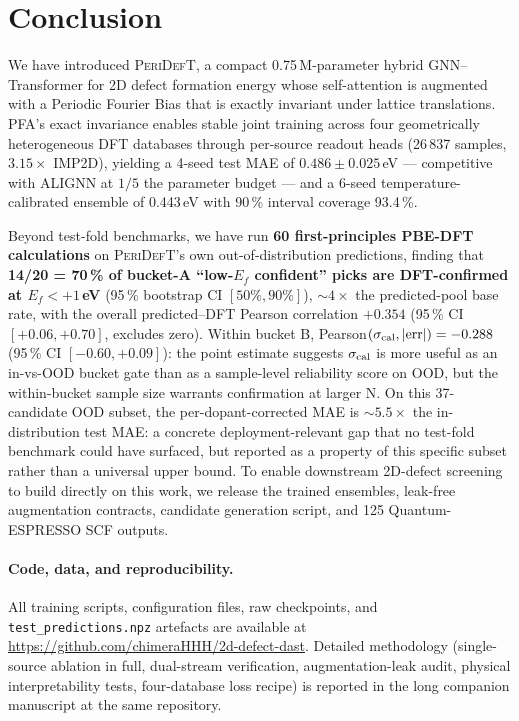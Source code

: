 \documentclass[11pt,a4paper]{article}
\newcommand{\modelname}{\textsc{PeriDefT}}
\begin{document}
\section{Conclusion}\label{sec:conclusion_short}

We have introduced \modelname, a compact 0.75\,M-parameter hybrid
GNN--Transformer for 2D defect formation energy whose self-attention
is augmented with a Periodic Fourier Bias that is exactly invariant
under lattice translations. PFA's exact invariance enables stable
joint training across four geometrically heterogeneous DFT
databases through per-source readout heads (26\,837 samples,
$3.15\times$ IMP2D), yielding a 4-seed test MAE of
$0.486\pm0.025$\,eV --- competitive with ALIGNN at $1/5$ the
parameter budget --- and a 6-seed temperature-calibrated ensemble
of 0.443\,eV with 90\,\% interval coverage 93.4\,\%.

Beyond test-fold benchmarks, we have run \textbf{60 first-principles
PBE-DFT calculations} on \modelname's own out-of-distribution
predictions, finding that \textbf{14/20 = 70\,\% of bucket-A
``low-$E_f$ confident'' picks are DFT-confirmed at
$E_f<+1$\,eV} (95\,\% bootstrap CI $[50\%, 90\%]$),
$\sim 4\times$ the predicted-pool base rate, with the overall
predicted--DFT Pearson correlation $+0.354$
(95\,\% CI $[+0.06, +0.70]$, excludes zero). Within bucket B,
Pearson$(\sigma_{\rm cal}, |\mathrm{err}|) = -0.288$
(95\,\% CI $[-0.60, +0.09]$): the point estimate suggests
$\sigma_{\rm cal}$ is more useful as an in-vs-OOD bucket gate than
as a sample-level reliability score on OOD, but the within-bucket
sample size warrants confirmation at larger N. On this 37-candidate
OOD subset, the per-dopant-corrected MAE is $\sim 5.5\times$ the
in-distribution test MAE: a concrete deployment-relevant gap that
no test-fold benchmark could have surfaced, but reported as a
property of this specific subset rather than a universal upper
bound. To enable downstream 2D-defect screening to build directly
on this work, we release the trained ensembles, leak-free
augmentation contracts, candidate generation script, and 125
Quantum-ESPRESSO SCF outputs.

\paragraph{Code, data, and reproducibility.}
All training scripts, configuration files, raw checkpoints, and
\texttt{test\_predictions.npz} artefacts are available at
\url{https://github.com/chimeraHHH/2d-defect-dast}. Detailed
methodology (single-source ablation in full, dual-stream
verification, augmentation-leak audit, physical interpretability
tests, four-database loss recipe) is reported in the long companion
manuscript at the same repository.
\end{document}
